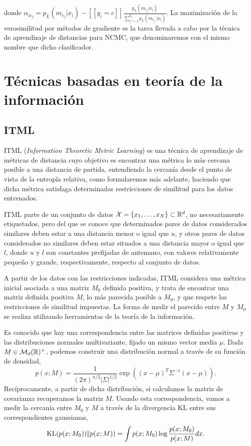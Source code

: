 donde $\alpha_{ic_j} = p_L(m_{c_j}|x_i) - [\![ y_i = c ]\!] \frac{p_L(m_{c_j}|x_i)}{\sum_{j'=1}^{k_c} p_L(m_{c_{j'}}|x_i)}$. La maximización de la verosimilitud por métodos de gradiente es la tarea llevada a cabo por la técnica de aprendizaje de distancias para NCMC, que denominaremos con el mismo nombre que dicho clasificador.





\section{Técnicas basadas en teoría de la información}

\subsection{ITML}

ITML (\emph{Information Theoretic Metric Learning}) \cite{itml} es una técnica de aprendizaje de métricas de distancia cuyo objetivo es encontrar una métrica lo más cercana posible a una distancia de partida, entendiendo la cercanía desde el punto de vista de la entropía relativa, como formularemos más adelante, haciendo que dicha métrica satisfaga determinadas restricciones de similitud para los datos entrenados.

ITML parte de un conjunto de datos $\mathcal{X} = \{x_1,\dots,x_N\} \subset \mathbb{R}^d$, no necesariamente etiquetados, pero del que se conoce que determinados pares de datos considerados similares deben estar a una distancia menor o igual que $u$, y otros pares de datos considerados no similares deben estar situados a una distancia mayor o igual que $l$, donde $u$ y $l$ son constantes prefijadas de antemano, con valores relativamente pequeño y grande, respectivamente, respecto al conjunto de datos.

A partir de los datos con las restricciones indicadas, ITML considera una métrica inicial asociada a una matriz $M_0$ definida positiva, y trata de encontrar una matriz definida positiva $M$, lo más parecida posible a $M_0$, y que respete las restricciones de similitud impuestas. La forma de medir el parecido entre $M$ y $M_0$ se realiza utilizando herramientas de la teoría de la información.

Es conocido que hay una correspondencia entre las matrices definidas positivas y las distribuciones normales multivariante, fijado un mismo vector media $\mu$. Dada $M \in \mathcal{M}_d(\mathbb{R})^+$, podemos construir una distribución normal a través de su función de densidad,
\[ p(x;M) = \frac{1}{(2\pi)^{n/2}|\Sigma|^{1/2}}\exp\left( (x-\mu)^T\Sigma^{-1}(x-\mu) \right). \]
Recíprocamente, a partir de dicha distribución, si calculamos la matriz de covarianza recuperamos la matriz $M$. Usando esta correspondencia, vamos a medir la cercanía entre $M_0$ y $M$ a través de la divergencia KL entre sus correspondientes gaussianas,
\[ \operatorname{KL}(p(x;M_0))\|p(x;M)) = \int p(x;M_0)\log\frac{p(x;M_0)}{p(x;M)}dx. \]


